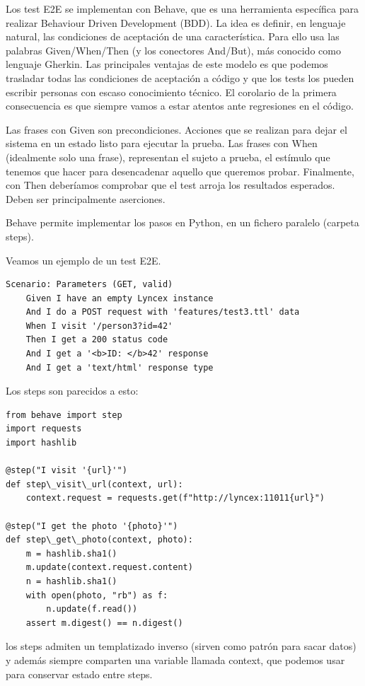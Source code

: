 \documentclass[12pt]{report} %
\begin{document}
Los test E2E se implementan con Behave, que es una herramienta específica para realizar Behaviour Driven Development (BDD). La idea es definir, en lenguaje natural, las condiciones de aceptación de una característica. Para ello usa las palabras Given/When/Then (y los conectores And/But), más conocido como lenguaje Gherkin. Las principales ventajas de este modelo es que podemos trasladar todas las condiciones de aceptación a código y que los tests los pueden escribir personas con escaso conocimiento técnico. El corolario de la primera consecuencia es que siempre vamos a estar atentos ante regresiones en el código.

Las frases con Given son precondiciones. Acciones que se realizan para dejar el sistema en un estado listo para ejecutar la prueba. Las frases con When (idealmente solo una frase), representan el sujeto a prueba, el estímulo que tenemos que hacer para desencadenar aquello que queremos probar. Finalmente, con Then deberíamos comprobar que el test arroja los resultados esperados. Deben ser principalmente aserciones.

Behave permite implementar los pasos en Python, en un fichero paralelo (carpeta steps).

Veamos un ejemplo de un test E2E.

\begin{lstlisting}
Scenario: Parameters (GET, valid)
    Given I have an empty Lyncex instance
    And I do a POST request with 'features/test3.ttl' data
    When I visit '/person3?id=42'
    Then I get a 200 status code
    And I get a '<b>ID: </b>42' response
    And I get a 'text/html' response type
\end{lstlisting}

Los steps son parecidos a esto:
\begin{lstlisting}
from behave import step
import requests
import hashlib

@step("I visit '{url}'")
def step\_visit\_url(context, url):
    context.request = requests.get(f"http://lyncex:11011{url}")

@step("I get the photo '{photo}'")
def step\_get\_photo(context, photo):
    m = hashlib.sha1()
    m.update(context.request.content)
    n = hashlib.sha1()
    with open(photo, "rb") as f:
        n.update(f.read())
    assert m.digest() == n.digest()
\end{lstlisting}

los steps admiten un templatizado inverso (sirven como patrón para sacar datos) y además siempre comparten una variable llamada context, que podemos usar para conservar estado entre steps.
\end{document}
